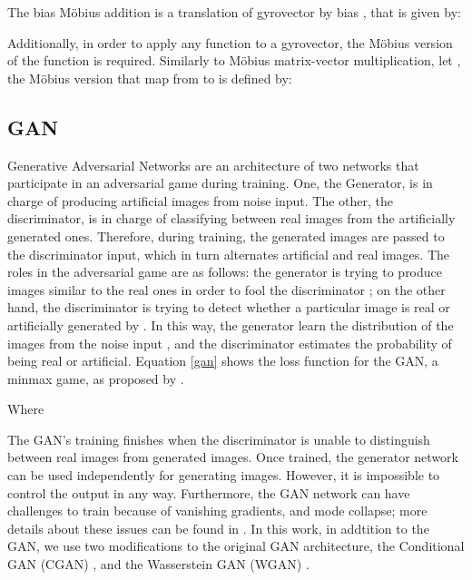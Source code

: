 \documentclass[journal]{IEEEtran}
\begin{document}
The bias Möbius addition is a translation of gyrovector  by bias , that is given by:





Additionally, in order to apply any function to a gyrovector, the Möbius version of the function is required. Similarly to Möbius matrix-vector multiplication, let , the Möbius version  that map from  to  is defined by:

 
\subsection{GAN}
Generative Adversarial Networks \cite{gan} are an architecture of two networks that participate in an adversarial game during training. One, the Generator, is in charge of producing artificial images from noise input. The other, the discriminator, is in charge of classifying between real images from the artificially generated ones. Therefore, during training, the generated images are passed to the discriminator input, which in turn alternates artificial and real images. The roles in the adversarial game are as follows: the generator  is trying to produce images similar to the real ones in order to fool the discriminator ; on the other hand, the discriminator is trying to detect whether a particular image is real or artificially generated by . In this way, the generator  learn the distribution  of the images  from the noise input , and the discriminator  estimates the probability of  being real or artificial. Equation \eqref{gan} shows the loss function for the GAN, a minmax game, as proposed by \cite{gan}.
 
 
 \begin{comment}
 
\end{comment}



Where






The GAN's training finishes when the discriminator is unable to distinguish between real images from generated images. Once trained, the generator network can be used independently for generating images. However, it is impossible to control the output in any way. Furthermore, the GAN network can have challenges to train because of vanishing gradients, and mode collapse; more details about these issues can be found in \cite{gan_train}. In this work, in addtition to the GAN,  we use two modifications to the original GAN architecture, the  Conditional GAN  (CGAN) \cite{cgan}, and the Wasserstein GAN (WGAN) \cite{wgan}.\newline
\end{document}
